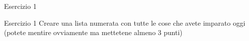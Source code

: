 \begin{frame}{Esercizio 1}

\begin{block}{Esercizio 1}
Creare una lista numerata con tutte le cose che avete imparato oggi (potete
mentire ovviamente ma mettetene almeno 3 punti)
\end{block}

\end{frame}
